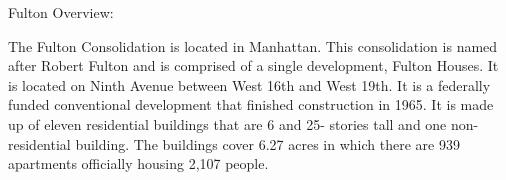 Fulton Overview:     

   

The Fulton Consolidation is located in Manhattan. This consolidation is named after Robert Fulton and is comprised of a single development, Fulton Houses. It is located on Ninth Avenue between West 16th and West 19th. It is a federally funded conventional development that finished construction in 1965. It is made up of eleven residential buildings that are 6 and 25- stories tall and one non-residential building. The buildings cover 6.27 acres in which there are 939 apartments officially housing 2,107 people.